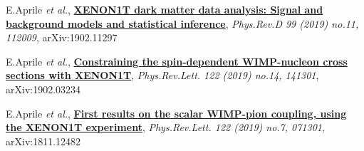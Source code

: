 \begin{scholarship}
	
	\scholarshipentry{[10]}
	                {E.Aprile \textit{et al.}, \href{https://journals.aps.org/prd/abstract/10.1103/PhysRevD.99.112009}{\textbf{XENON1T dark matter data analysis: Signal and background models and statistical inference}}, \textit{Phys.Rev.D 99 (2019) no.11, 112009}, arXiv:1902.11297}
	              
	                
	 \scholarshipentry{[11]}
	                {E.Aprile \textit{et al.}, \href{https://journals.aps.org/prl/abstract/10.1103/PhysRevLett.122.141301}{\textbf{Constraining the spin-dependent WIMP-nucleon cross sections with XENON1T}}, \textit{Phys.Rev.Lett. 122 (2019) no.14, 141301}, arXiv:1902.03234 }


    \scholarshipentry{[12]}
                    {E.Aprile \textit{et al.}, \href{https://journals.aps.org/prl/abstract/10.1103/PhysRevLett.122.071301}{\textbf{First results on the scalar WIMP-pion coupling, using the XENON1T experiment}}, \textit{Phys.Rev.Lett. 122 (2019) no.7, 071301}, arXiv:1811.12482}
   \emptySeparator                   
\end{scholarship}